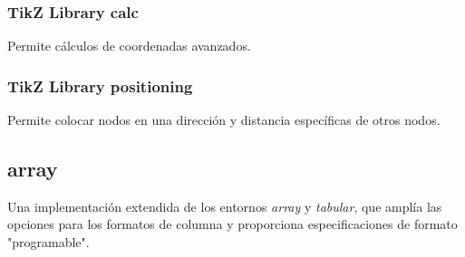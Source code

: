 \documentclass[12pt]{article}
\begin{document}
\subsubsection{TikZ Library calc}
Permite cálculos de coordenadas avanzados.\cite{calc}
\subsubsection{TikZ Library positioning}
Permite colocar nodos en una dirección y distancia específicas de otros nodos.\cite{positioning}
\subsection{array}
Una implementación extendida de los entornos \textit{array} y \textit{tabular}, que amplía las opciones para los formatos de columna y proporciona especificaciones de formato "programable".\cite{array}


\newpage


\end{document}
